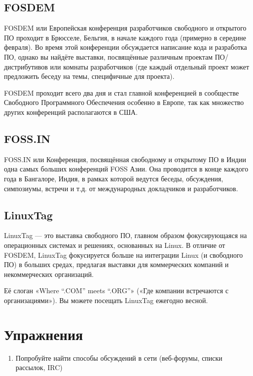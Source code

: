 \documentclass[12pt]{book}
\begin{document}
\subsection{FOSDEM}

FOSDEM или Европейская конференция разработчиков свободного и открытого ПО проходит в Брюсселе, Бельгия, в начале каждого года (примерно в середине февраля). Во время этой конференции обсуждается написание кода и разработка ПО, однако вы найдёте выставки, посвящённые различным проектам ПО/дистрибутивов или комнаты разработчиков (где каждый отдельный проект может предложить беседу на темы, специфичные для проекта).

FOSDEM проходит всего два дня и стал главной конференцией в сообществе Свободного Программного Обеспечения особенно в Европе, так как множество других конференций располагаются в США.

\subsection{FOSS.IN}

FOSS.IN или Конференция, посвящённая свободному и открытому ПО в Индии  одна самых больших конференций FOSS Азии. Она проводится в конце каждого года в Бангалоре, Индия, в рамках которой ведутся беседы, обсуждения, симпозиумы, встречи и т.д. от международных докладчиков и разработчиков.

\subsection{LinuxTag}

LinuxTag — это выставка свободного ПО, главном образом фокусирующаяся на операционных системах  и решениях, основанных на Linux. В отличие от FOSDEM, LinuxTag фокусируется больше на интеграции Linux (и свободного ПО) в больших средах, предлагая выставки для коммерческих компаний и некоммерческих организаций.

Её слоган «Where ``.COM'' meets ``.ORG''» («Где компании встречаются с организациями»). Вы можете посещать LinuxTag ежегодно весной.

\newpage
{\color{white}\section{Упражнения}}
\begin{tcolorbox}[title=\textbf{Упражнения}, colback=yellow!14!white, colframe=red!75!white]
\begin{enumerate}
	\item Попробуйте найти способы обсуждений в сети (веб-форумы, списки рассылок, IRC)
	\end{enumerate}
\end{tcolorbox}
\end{document}
